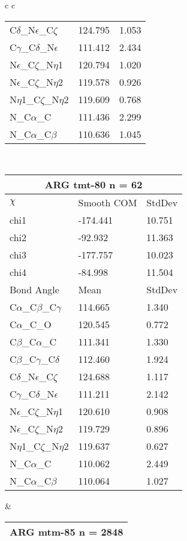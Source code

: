 \begin{longtable}{ c c }
\begin{tabular}{ l l l }
  C$\delta$\_N$\epsilon$\_C$\zeta$ & 124.795 & 1.053\\
  C$\gamma$\_C$\delta$\_N$\epsilon$ & 111.412 & 2.434\\
  N$\epsilon$\_C$\zeta$\_N$\eta$1 & 120.794 & 1.020\\
  N$\epsilon$\_C$\zeta$\_N$\eta$2 & 119.578 & 0.926\\
  N$\eta$1\_C$\zeta$\_N$\eta$2 & 119.609 & 0.768\\
  N\_C$\alpha$\_C & 111.436 & 2.299\\
  N\_C$\alpha$\_C$\beta$ & 110.636 & 1.045\\
  \bottomrule
  \end{tabular}
  \\
  \begin{tabular}{ l l l }
  \toprule
  \multicolumn{3}{c}{ARG \textbf{tmt-80} n = 62} \\ \toprule
  $\chi$       & Smooth COM & StdDev \\ \midrule
  chi1 & -174.441 & 10.751 \\ 
  chi2 & -92.932 & 11.363 \\ 
  chi3 & -177.757 & 10.023 \\ 
  chi4 & -84.998 & 11.504 \\ \midrule
  Bond Angle   & Mean     & StdDev \\ \midrule
  C$\alpha$\_C$\beta$\_C$\gamma$ & 114.665 & 1.340\\
  C$\alpha$\_C\_O & 120.545 & 0.772\\
  C$\beta$\_C$\alpha$\_C & 111.341 & 1.330\\
  C$\beta$\_C$\gamma$\_C$\delta$ & 112.460 & 1.924\\
  C$\delta$\_N$\epsilon$\_C$\zeta$ & 124.688 & 1.117\\
  C$\gamma$\_C$\delta$\_N$\epsilon$ & 111.211 & 2.142\\
  N$\epsilon$\_C$\zeta$\_N$\eta$1 & 120.610 & 0.908\\
  N$\epsilon$\_C$\zeta$\_N$\eta$2 & 119.729 & 0.896\\
  N$\eta$1\_C$\zeta$\_N$\eta$2 & 119.637 & 0.627\\
  N\_C$\alpha$\_C & 110.062 & 2.449\\
  N\_C$\alpha$\_C$\beta$ & 110.064 & 1.027\\
  \bottomrule
  \end{tabular}
  &
  \begin{tabular}{ l l l }
  \toprule
  \multicolumn{3}{c}{ARG \textbf{mtm-85} n = 2848} \\ \toprule

\end{tabular}
\end{longtable}
